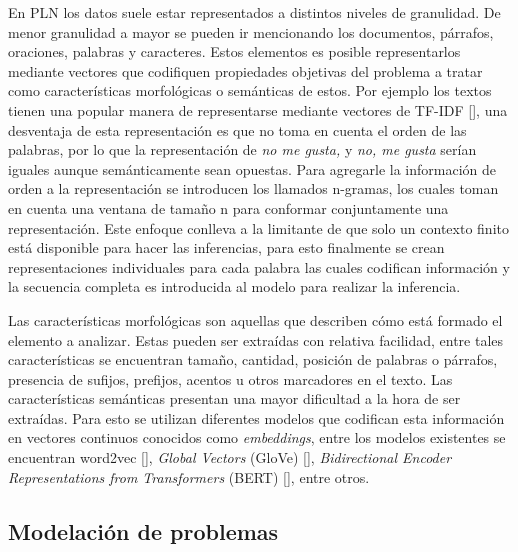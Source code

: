 En PLN los datos suele estar representados a distintos niveles de granulidad.
De menor granulidad a mayor se pueden ir mencionando los documentos, párrafos, oraciones, palabras y
caracteres. Estos elementos es posible representarlos mediante vectores que codifiquen propiedades
objetivas del problema a tratar como características morfológicas o semánticas de estos. Por ejemplo 
los textos tienen una popular manera de representarse mediante vectores de TF-IDF [\cite{manning2008introduction}],
una desventaja de esta representación es que no toma en cuenta el orden de las palabras, por lo que 
la representación de \emph{no me gusta,} y \emph{no, me gusta} serían iguales aunque semánticamente 
sean opuestas. Para agregarle la información de orden a la representación se introducen los llamados 
n-gramas, los cuales toman en cuenta una ventana de tamaño n para conformar conjuntamente una representación.
Este enfoque conlleva a la limitante de que solo un contexto finito está disponible para hacer las inferencias,
para esto finalmente se crean representaciones individuales para cada palabra las cuales codifican 
información y la secuencia completa es introducida al modelo para realizar la inferencia.

Las características morfológicas son aquellas que describen cómo está formado el elemento a analizar.
Estas pueden ser extraídas con relativa facilidad, entre tales características se encuentran tamaño, 
cantidad, posición de palabras o párrafos, presencia de sufijos, prefijos, acentos u otros marcadores
en el texto. Las características semánticas presentan una mayor dificultad a la hora de ser extraídas.
Para esto se utilizan diferentes modelos que codifican esta información en vectores continuos conocidos como 
\emph{embeddings}, entre los modelos existentes se encuentran
word2vec [\cite{mikolov2013efficient}], 
\emph{Global Vectors} (GloVe) [\cite{pennington2014glove}], 
\emph{Bidirectional Encoder Representations from Transformers} (BERT) [\cite{devlin2018bert}],
entre otros.

\subsection{Modelación de problemas}

